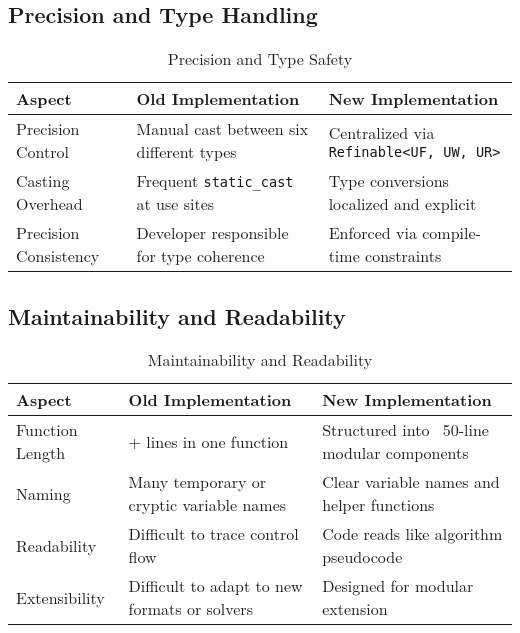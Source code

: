 \documentclass[12pt, titlepage]{article}
\begin{document}
\subsection*{Precision and Type Handling}

\begin{table}[H]
  \centering
  \begin{tabularx}{\linewidth}{%
    >{\raggedright\arraybackslash}l
    >{\raggedright\arraybackslash}X
    >{\raggedright\arraybackslash}X
    }
    \toprule
    \textbf{Aspect}             & \textbf{Old Implementation}                    & \textbf{New Implementation}                    \\
    \midrule
    Precision Control     & Manual cast between six different types  & Centralized via \texttt{Refinable<UF, UW, UR>} \\
    Casting Overhead      & Frequent \texttt{static\_cast} at use sites    & Type conversions localized and explicit  \\
    Precision Consistency & Developer responsible for type coherence & Enforced via compile-time constraints    \\
    \bottomrule
  \end{tabularx}
  \caption{Precision and Type Safety}
\end{table}

\subsection*{Maintainability and Readability}

\begin{table}[H]
  \centering
  \begin{tabularx}{\linewidth}{%
    >{\raggedright\arraybackslash}l
    >{\raggedright\arraybackslash}X
    >{\raggedright\arraybackslash}X
    }
    \toprule
    \textbf{Aspect}       & \textbf{Old Implementation}                        & \textbf{New Implementation}                       \\
    \midrule
    Function Length & 500+ lines in one function                   & Structured into ~50-line modular components \\
    Naming          & Many temporary or cryptic variable names     & Clear variable names and helper functions   \\
    Readability     & Difficult to trace control flow              & Code reads like algorithm pseudocode        \\
    Extensibility   & Difficult to adapt to new formats or solvers & Designed for modular extension              \\
    \bottomrule
  \end{tabularx}
  \caption{Maintainability and Readability}
\end{table}
\end{document}
